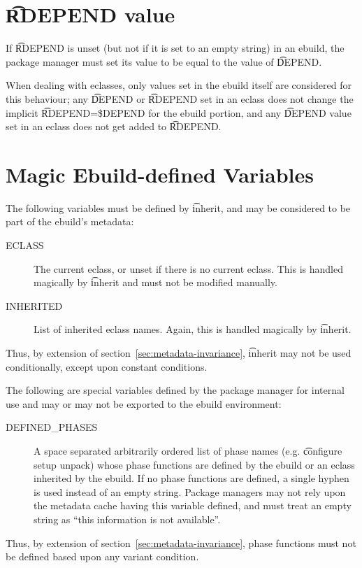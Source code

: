 \section{\t{RDEPEND} value}
\label{sec:rdepend-depend}

If \t{RDEPEND} is unset (but not if it is set to an empty string) in an ebuild, the package manager
must set its value to be equal to the value of \t{DEPEND}.

When dealing with eclasses, only values set in the ebuild itself are considered for this behaviour;
any \t{DEPEND} or \t{RDEPEND} set in an eclass does not change the implicit \t{RDEPEND=\$DEPEND} for
the ebuild portion, and any \t{DEPEND} value set in an eclass does not get added to \t{RDEPEND}.

\section{Magic Ebuild-defined Variables}

The following variables must be defined by \t{inherit}, and may be considered to be part
of the ebuild's metadata:

\begin{description}
\item[ECLASS] The current eclass, or unset if there is no current eclass. This is handled magically
    by \t{inherit} and must not be modified manually.
\item[INHERITED] List of inherited eclass names. Again, this is handled magically by \t{inherit}.
\end{description}

\note Thus, by extension of section~\ref{sec:metadata-invariance}, \t{inherit} may not be used
    conditionally, except upon constant conditions.

The following are special variables defined by the package manager for internal use and may or may
not be exported to the ebuild environment:

\begin{description}
\item[DEFINED\_PHASES] A space separated arbitrarily ordered list of phase names (e.g. \t{configure
setup unpack}) whose phase functions are defined by the ebuild or an eclass inherited by the ebuild.
If no phase functions are defined, a single hyphen is used instead of an empty string. Package
managers may not rely upon the metadata cache having this variable defined, and must treat an empty
string as ``this information is not available''.
\end{description}

\note Thus, by extension of section~\ref{sec:metadata-invariance}, phase functions must not be defined
based upon any variant condition.


